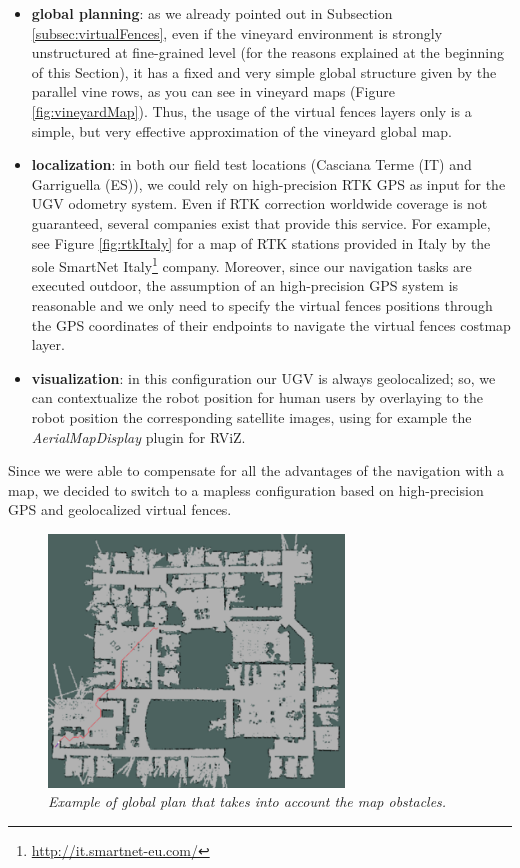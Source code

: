 \begin{itemize}
	\item \textbf{global planning}: as we already pointed out in Subsection \ref{subsec:virtualFences}, even if the vineyard environment is strongly unstructured at fine-grained level (for the reasons explained at the beginning of this Section), it has a fixed and very simple global structure given by the parallel vine rows, as you can see in vineyard maps (Figure \ref{fig:vineyardMap}). Thus, the usage of the virtual fences layers only is a simple, but very effective approximation of the vineyard global map.
	\item \textbf{localization}: in both our field test locations (Casciana Terme (IT) and Garriguella (ES)), we could rely on high-precision RTK GPS \parencite{rtk} as input for the \ac{UGV} odometry system. Even if RTK correction worldwide coverage is not guaranteed, several companies exist that provide this service. For example, see Figure \ref{fig:rtkItaly} for a map of RTK stations provided in Italy by the sole SmartNet Italy\footnote{\url{http://it.smartnet-eu.com/}}
company. Moreover, since our navigation tasks are executed outdoor, the assumption of an high-precision GPS system is reasonable and we only need to specify the virtual fences positions through the GPS coordinates of their endpoints to navigate the virtual fences costmap layer.
	\item \textbf{visualization}: in this configuration our \ac{UGV} is always geolocalized; so, we can contextualize the robot position for human users by overlaying to the robot position the corresponding satellite images, using for example the \textit{AerialMapDisplay} plugin for RViZ.
\end{itemize}
Since we were able to compensate for all the advantages of the navigation with a map, we decided to switch to a mapless configuration based on high-precision GPS and geolocalized virtual fences.


\begin{figure}
	\centering
	\includegraphics[width=0.7\textwidth]{Images/localization/map_global_planner.png}
	\caption{\textit{Example of global plan that takes into account the map obstacles.}}
	\label{fig:mapGlobalPlanner}
\end{figure}

